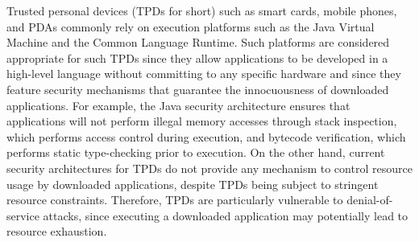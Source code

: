 
Trusted personal devices (TPDs for short) such as smart cards,
mobile phones, and PDAs commonly rely on execution platforms such as the Java
Virtual Machine and the Common Language Runtime. Such platforms are
considered appropriate for such TPDs since they allow applications to
be developed in a high-level language without committing to any
specific hardware and since they feature security mechanisms that
guarantee the innocuousness of downloaded applications. For example,
the Java security architecture ensures that applications will not
perform illegal memory accesses through stack inspection, which
performs access control during execution, and bytecode verification,
which performs static type-checking prior to execution.  On the other
hand, current security architectures for TPDs do not provide any
mechanism to control resource usage by downloaded applications,
despite TPDs being subject to stringent resource constraints.
Therefore, TPDs are particularly vulnerable to denial-of-service
attacks, since executing a downloaded application may potentially lead
to resource exhaustion.


